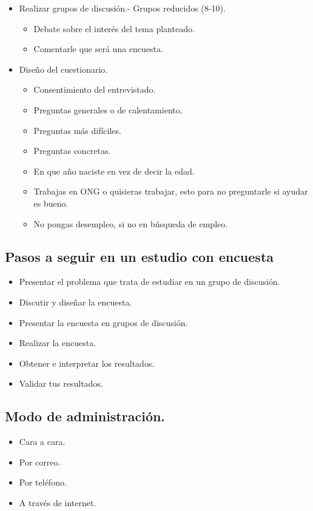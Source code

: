 \begin{itemize}
    \item Realizar grupos de discusión.- Grupos reducidos (8-10).
    \begin{itemize}
	\item Debate sobre el interés del tema planteado.
	\item Comentarle que será una encuesta.
    \end{itemize}
    \item Diseño del cuestionario.
    \begin{itemize}
	\item Consentimiento del entrevistado.
	\item Preguntas generales o de calentamiento.
	\item Preguntas más difíciles.
	\item Preguntas concretas.
	\item En que año naciste en vez de decir la edad.
	\item Trabajas en ONG o quisieras trabajar, esto para no preguntarle si ayudar es bueno.
	\item No pongas desempleo, si no en búsqueda de empleo.
    \end{itemize}
\end{itemize}

\subsection{Pasos a seguir en un estudio con encuesta}
\begin{itemize}
    \item Presentar el problema que trata de estudiar en un grupo de discusión.
    \item Discutir y diseñar la encuesta.
    \item Presentar la encuesta en grupos de discusión.
    \item Realizar la encuesta.
    \item Obtener e interpretar los resultados.
    \item Validar tus resultados.
\end{itemize}


\subsection{Modo de administración.}

\begin{itemize}
    \item Cara a cara.
    \item Por correo.
    \item Por teléfono.
    \item A través de internet.
\end{itemize}


